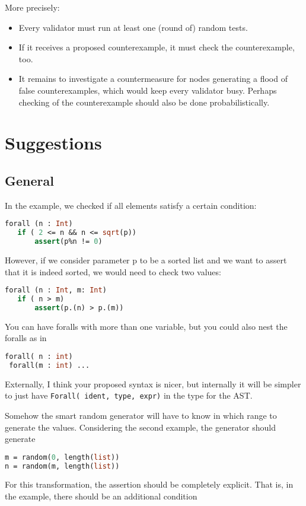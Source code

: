 \documentclass{article}
\begin{document}
\begin{itemize}
  More precisely:
  \begin{itemize}
  \item Every validator must run at least one (round of) random tests.  
  \item If it receives a proposed counterexample, it must check the counterexample,
    too.
  \item It remains to investigate a countermeasure for nodes generating a flood of
    false counterexamples, which would keep every validator busy. Perhaps checking of
    the counterexample should also be done probabilistically.
  \end{itemize}
\end{itemize}

\section{Suggestions}

\subsection{General}
\label{sec:suggestions-general}


In the example, we checked if all elements satisfy a certain condition:
\begin{lstlisting}[language=Caml]
forall (n : Int)
   if ( 2 <= n && n <= sqrt(p))
       assert(p%n != 0)
\end{lstlisting}
However, if we consider  parameter p to be a sorted list and we want
to assert that it is indeed sorted, we would need to check two values: 
\begin{lstlisting}[language=Caml]
forall (n : Int, m: Int)
   if ( n > m)
       assert(p.(n) > p.(m))
\end{lstlisting}

You can have foralls with more than one variable, but you could also nest the foralls as in

\begin{lstlisting}[language=Caml]
forall( n : int)
 forall(m : int) ...
\end{lstlisting}
Externally, I think your proposed syntax is nicer, but internally it will be simpler to just have 
\lstinline/Forall( ident, type, expr)/
in the type for the AST.


Somehow the smart random generator will have to know in which range to
generate the values.  Considering the second example, the generator should generate 
\begin{lstlisting}[language=Caml]
m = random(0, length(list))
n = random(m, length(list))
\end{lstlisting}
For this transformation, the assertion should be completely explicit.
That is, in the example, there should be an additional condition
\end{document}
